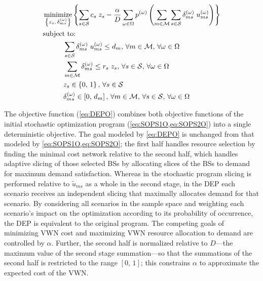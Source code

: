 \documentclass[12pt,dvipsnames]{report}
\DeclareMathOperator*{\argmin}{minimize}
\begin{document}
\begin{tcolorbox}[floatplacement = ht, float, title = Deterministic Equivalent Program (DEP) of \Cref{eq:SOPS1O,eq:SOPS1C1,eq:SOPS2O,eq:SOPS2C1,eq:SOPS2C2,eq:SOPS2C3,eq:SOPS2C4}]
	\begin{align}
		& \argmin_{\left\{ z_s,\, \delta_{ms}^{\left( \omega \right)} \right\}} \left\{ \sum_{s \in \mathcal{S}} c_s \; z_s - \frac{\alpha}{D} \sum_{\omega \in \Omega} p^{\left( \omega \right)} \left( \sum_{m \in \mathcal{M}} \sum_{s \in \mathcal{S}} \delta_{ms}^{\left( \omega \right)} \; u_{ms}^{\left( \omega \right)} \right) \right\} \label{eq:DEPO}\\
		& \text{subject to:} \nonumber \\
		& \hspace{0.4in} \sum_{s \in \mathcal{S}} \delta_{ms}^{\left( \omega \right)} \; u_{ms}^{\left( \omega \right)} \leq d_m,\, \forall m \in \mathcal{M},\, \forall \omega \in \Omega \label{eq:DEPC1}\\
		& \hspace{0.4in} \sum_{m \in \mathcal{M}} \delta_{ms}^{\left( \omega \right)} \leq r_s \; z_s,\, \forall s \in \mathcal{S},\, \forall \omega \in \Omega \label{eq:DEPC2}\\
		& \hspace{0.4in} z_s \in \left\{ 0,\, 1 \right\},\, \forall s \in \mathcal{S} \label{eq:DEPC3}\\
		& \hspace{0.4in} \delta_{ms}^{\left( \omega \right)} \in \left[ 0,\, d_m \right],\, \forall m \in \mathcal{M},\, \forall s \in \mathcal{S},\, \forall \omega \in \Omega \label{eq:DEPC4}
	\end{align}
\end{tcolorbox}

The objective function (\cref{eq:DEPO}) combines both objective functions of the initial stochastic optimization program (\cref{eq:SOPS1O,eq:SOPS2O}) into a single deterministic objective.  The goal modeled by \cref{eq:DEPO} is unchanged from that modeled by \cref{eq:SOPS1O,eq:SOPS2O}; the first half handles resource selection by finding the minimal cost network relative to the second half, which handles adaptive slicing of those selected BSs by allocating slices of the BSs to demand for maximum demand satisfaction.  Whereas in the stochastic program slicing is performed relative to $\tilde{u}_{ms}$ as a whole in the second stage, in the DEP each scenario receives an independent slicing that maximally allocates demand for that scenario.  By considering all scenarios in the sample space and weighting each scenario's impact on the optimization according to its probability of occurrence, the DEP is equivalent to the original program.  The competing goals of minimizing VWN cost and maximizing VWN resource allocation to demand are controlled by $\alpha$.  Further, the second half is normalized relative to $D$---the maximum value of the second stage summation---so that the summations of the second half is restricted to the range $\left[ 0,\, 1 \right]$; this constrains $\alpha$ to approximate the expected cost of the VWN.
\end{document}
